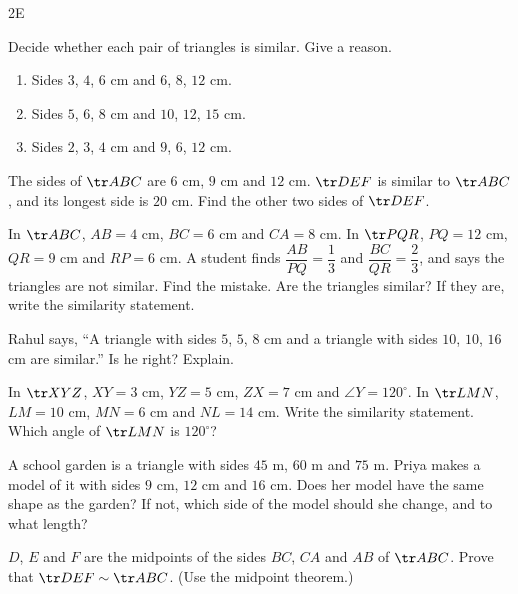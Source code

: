 \begin{exercise}{2E}
  \item Decide whether each pair of triangles is similar. Give a reason.
  \begin{enumerate}[label=(\alph*),itemsep=1pt]
    \item Sides $3$, $4$, $6$ cm and $6$, $8$, $12$ cm.
    \item Sides $5$, $6$, $8$ cm and $10$, $12$, $15$ cm.
    \item Sides $2$, $3$, $4$ cm and $9$, $6$, $12$ cm.
  \end{enumerate}
  \item The sides of $\tr ABC$ are $6$ cm, $9$ cm and $12$ cm. $\tr DEF$ is similar to $\tr ABC$, and its longest side is $20$ cm. Find the other two sides of $\tr DEF$.
  \item In $\tr ABC$, $AB=4$ cm, $BC=6$ cm and $CA=8$ cm. In $\tr PQR$, $PQ=12$ cm, $QR=9$ cm and $RP=6$ cm. A student finds $\dfrac{AB}{PQ}=\dfrac13$ and $\dfrac{BC}{QR}=\dfrac23$, and says the triangles are not similar. Find the mistake. Are the triangles similar? If they are, write the similarity statement.
  \item Rahul says, ``A triangle with sides $5$, $5$, $8$ cm and a triangle with sides $10$, $10$, $16$ cm are similar.'' Is he right? Explain.
  \item In $\tr XYZ$, $XY=3$ cm, $YZ=5$ cm, $ZX=7$ cm and $\angle Y=120^\circ$. In $\tr LMN$, $LM=10$ cm, $MN=6$ cm and $NL=14$ cm. Write the similarity statement. Which angle of $\tr LMN$ is $120^\circ$?
  \item A school garden is a triangle with sides $45$ m, $60$ m and $75$ m. Priya makes a model of it with sides $9$ cm, $12$ cm and $16$ cm. Does her model have the same shape as the garden? If not, which side of the model should she change, and to what length?
  \item $D$, $E$ and $F$ are the midpoints of the sides $BC$, $CA$ and $AB$ of $\tr ABC$. Prove that $\tr DEF\sim\tr ABC$. (Use the midpoint theorem.)
\end{exercise}

